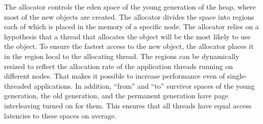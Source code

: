 The allocator controls the eden space of the young generation of the
heap, where most of the new objects are created. The allocator divides
the space into regions each of which is placed in the memory of a
specific node. The allocator relies on a hypothesis that a thread that
allocates the object will be the most likely to use the object. To
ensure the fastest access to the new object, the allocator places it
in the region local to the allocating thread. The regions can be
dynamically resized to reflect the allocation rate of the application
threads running on different nodes. That makes it possible to increase
performance even of single-threaded applications. In addition,
``from'' and ``to'' survivor spaces of the young generation, the old
generation, and the permanent generation have page interleaving turned
on for them. This ensures that all threads have equal access latencies
to these spaces on average.

